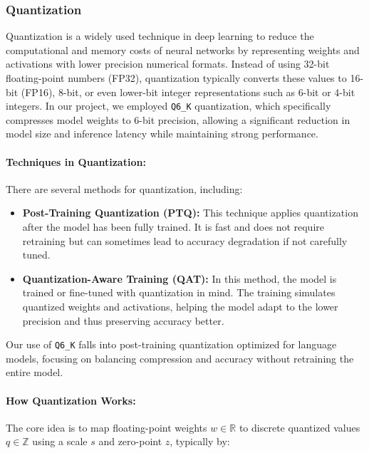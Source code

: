 \subsubsection{Quantization}
\label{sssec: quantization}

Quantization is a widely used technique in deep learning to reduce the computational and memory costs of neural networks by representing weights and activations with lower precision numerical formats. Instead of using 32-bit floating-point numbers (FP32), quantization typically converts these values to 16-bit (FP16), 8-bit, or even lower-bit integer representations such as 6-bit or 4-bit integers.
In our project, we employed \texttt{Q6\_K} quantization, which specifically compresses model weights to 6-bit precision, allowing a significant reduction in model size and inference latency while maintaining strong performance.

\paragraph{Techniques in Quantization:}
There are several methods for quantization, including:

\begin{itemize}
    \item \textbf{Post-Training Quantization (PTQ):} This technique applies quantization after the model has been fully trained. It is fast and does not require retraining but can sometimes lead to accuracy degradation if not carefully tuned.
    
    \item \textbf{Quantization-Aware Training (QAT):} In this method, the model is trained or fine-tuned with quantization in mind. The training simulates quantized weights and activations, helping the model adapt to the lower precision and thus preserving accuracy better.
\end{itemize}

Our use of \texttt{Q6\_K} falls into post-training quantization optimized for language models, focusing on balancing compression and accuracy without retraining the entire model.

\paragraph{How Quantization Works:}
The core idea is to map floating-point weights $w \in \mathbb{R}$ to discrete quantized values $q \in \mathbb{Z}$ using a scale $s$ and zero-point $z$, typically by:

